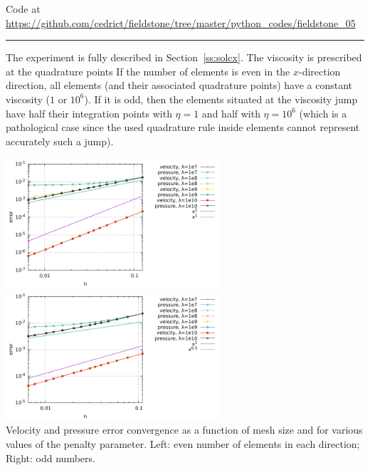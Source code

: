 

\begin{center}
Code at \url{https://github.com/cedrict/fieldstone/tree/master/python_codes/fieldstone_05}
\end{center}

\par\noindent\rule{\textwidth}{0.4pt}

The experiment is fully described in Section~\ref{ss:solcx}.
The viscosity is prescribed at the quadrature points 
If the number of elements is even in the $x$-direction direction, all elements 
(and their associated quadrature points)
have a constant viscosity ($1$ or  $10^6$). If it is odd, then the elements situated 
at the viscosity jump have half their integration points with $\eta=1$ and half 
with $\eta=10^6$ 
(which is a pathological case since the used quadrature rule inside elements cannot represent 
accurately such a jump).  

\begin{center}
\includegraphics[width=8cm]{python_codes/fieldstone_05/results/errors_even.pdf}
\includegraphics[width=8cm]{python_codes/fieldstone_05/results/errors_odd.pdf}\\
{\captionfont Velocity and pressure error convergence as a function of mesh size and for various values
of the penalty parameter. Left: even number of elements in each direction; Right: odd numbers.
}
\end{center}

